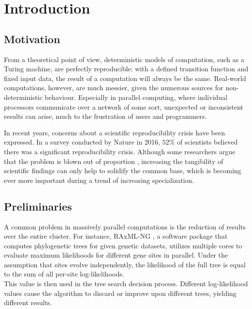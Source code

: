 \chapter{Introduction}
\label{ch:Introduction}


\section{Motivation}
\label{sec:Motivation}
From a theoretical point of view, deterministic models of computation, such as a Turing machine, are perfectly reproducible:
with a defined transition function and fixed input data, the result of a computation will always be the same.
Real-world computations, however, are much messier, given the numerous sources for non-deterministic behaviour.
Especially in parallel computing, where individual processors communicate over a network of some sort, unexpected or
inconsistent results can arise, much to the frustration of users and programmers.

In recent years, concerns about a scientific reproducibility crisis have been expressed. In a survey \cite{baker_reproducibility_2016}
conducted by Nature in 2016, $52\%$ of scientists believed there was a significant reproducibility crisis.
Although some researchers argue that the problem is blown out of proportion \cite{fanelli_opinion_2018}, increasing the tangibility
of scientific findings can only help to solidify the common base, which is becoming ever more important during a trend of
increasing specialization.

\section{Preliminaries}

A common problem in massively parallel computations is the reduction of results over the entire cluster.
For instance, RAxML-NG \cite{kozlov_raxml-ng_2019-1}, a software package that computes phylogenetic trees for given genetic datasets,
utilizes multiple cores to evaluate maximum likelihoods for different gene sites in parallel.
Under the assumption that sites evolve independently, the likelihood of the full tree is equal to the sum of all per-site
log-likelihoods.\\
This value is then used in the tree search decision process.
Different log-likelihood values cause the algorithm to discard or improve upon different trees, yielding different results.


\label{sec:Preliminaries}